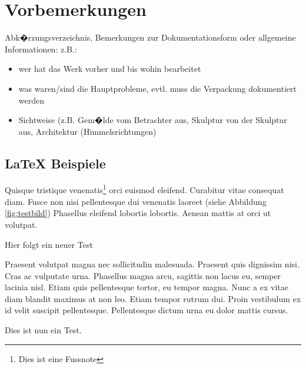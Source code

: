 
\chapter{Vorbemerkungen}
\label{chap:vorbemerkungen}

Abk�rzungsverzeichnis, Bemerkungen zur Dokumentationsform oder allgemeine Informationen: z.B.: 

\begin{itemize}
	\item wer hat das Werk vorher und bis wohin bearbeitet
	\item was waren/sind die Hauptprobleme, evtl. muss die Verpackung dokumentiert werden
	\item Sichtweise (z.B. Gem�lde vom Betrachter aus, Skulptur von der Skulptur aus, Architektur (Himmelsrichtungen)
\end{itemize}


\section{LaTeX Beispiele}

Quisque tristique venenatis\footnote{Dies ist eine Fussnote} orci euismod eleifend. Curabitur vitae consequat diam. Fusce non nisi pellentesque dui venenatis laoreet (siehe Abbildung \ref{fig:testbild}) Phasellus eleifend lobortis lobortis. Aenean mattis at orci ut volutpat. 

Hier folgt ein neuer Test \autocite[56]{heideggerTechnikUndKehre2002}


Praesent volutpat magna nec sollicitudin malesuada. Praesent quis dignissim nisi. Cras ac vulputate urna. Phasellus magna arcu, sagittis non lacus eu, semper lacinia nisl. Etiam quis pellentesque tortor, eu tempor magna. Nunc a ex vitae diam blandit maximus at non leo. Etiam tempor rutrum dui. Proin vestibulum ex id velit suscipit pellentesque. Pellentesque dictum urna eu dolor mattis cursus. \autocites{adrianiJosephBeuysLeben1986a} \\
\autocites[S. 56f.]{schmidtProfessionelleVideotechnikGrundlagen2013}

Dies ist nun ein Test. \autocite[S. 56f.]{adlerRestaurierungSchlagschadensMobel2005}


\bigskip

